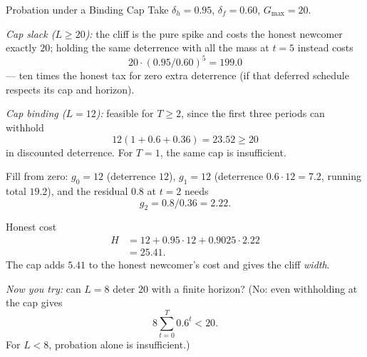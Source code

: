 \documentclass[11pt,a4paper]{article}
\theoremstyle{definition}
\begin{document}
\begin{pdexample}{Probation under a Binding Cap}
\setlength{\parskip}{4pt plus 1pt}
\label{ex:binding-probation}
Take $\delta_h=0.95$, $\delta_f=0.60$,
$G_{\max}=20$.

\emph{Cap slack ($L\ge 20$):} the cliff is the pure spike and costs
the honest newcomer exactly $20$; holding the same deterrence with all the mass at
$t=5$ instead costs
\[
20\cdot(0.95/0.60)^5 = 199.0
\]
--- ten times the honest tax for
zero extra deterrence (if that deferred schedule respects its cap and horizon).

\emph{Cap binding ($L=12$):} feasible for $T\ge2$, since the first three
periods can withhold
\[
12(1+0.6+0.36)=23.52\ge20
\]
in discounted deterrence.
For $T=1$, the same cap is insufficient.

Fill from zero: $g_0=12$ (deterrence $12$),
$g_1=12$ (deterrence $0.6\cdot 12=7.2$, running total $19.2$), and the residual
$0.8$ at $t=2$ needs
\[
g_2=0.8/0.36=2.22.
\]

Honest cost
\[
\begin{aligned}
H &= 12 + 0.95\cdot 12 + 0.9025\cdot 2.22\\
&= 25.41.
\end{aligned}
\]
The cap adds $5.41$ to the honest newcomer's cost and gives the cliff
\emph{width}.

\emph{Now you try:} can $L=8$ deter $20$ with a finite horizon?
(No: even withholding at the cap gives
\[
8\sum_{t=0}^{T}0.6^t<20.
\]
For $L<8$, probation alone is insufficient.)
\end{pdexample}
\end{document}
